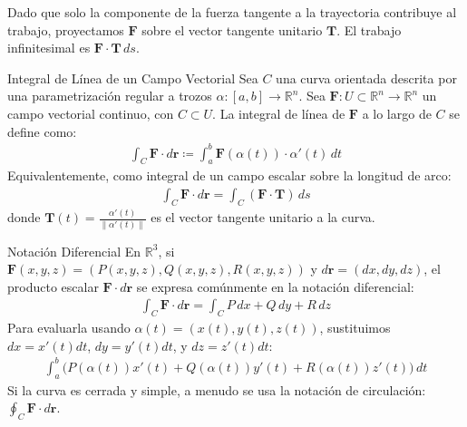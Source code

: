 \documentclass[11pt,a4paper]{article}
\begin{document}
Dado que solo la componente de la fuerza tangente a la trayectoria contribuye al trabajo, proyectamos $\mathbf{F}$ sobre el vector tangente unitario $\mathbf{T}$. El trabajo infinitesimal es $\mathbf{F} \cdot \mathbf{T} \, ds$.

\begin{definicionbox}{Integral de Línea de un Campo Vectorial}
Sea $C$ una curva orientada descrita por una parametrización regular a trozos $\alpha: [a,b] \to \mathbb{R}^n$. Sea $\mathbf{F}: U \subset \mathbb{R}^n \to \mathbb{R}^n$ un campo vectorial continuo, con $C \subset U$. La integral de línea de $\mathbf{F}$ a lo largo de $C$ se define como:
\begin{align*}
\int_C \mathbf{F} \cdot d\mathbf{r} \coloneqq \int_a^b \mathbf{F}(\alpha(t)) \cdot \alpha'(t) \, dt
\end{align*}
Equivalentemente, como integral de un campo escalar sobre la longitud de arco:
\begin{align*}
\int_C \mathbf{F} \cdot d\mathbf{r} = \int_C (\mathbf{F} \cdot \mathbf{T}) \, ds
\end{align*}
donde $\mathbf{T}(t) = \frac{\alpha'(t)}{\|\alpha'(t)\|}$ es el vector tangente unitario a la curva.
\end{definicionbox}

\begin{observacionbox}{Notación Diferencial}
En $\mathbb{R}^3$, si $\mathbf{F}(x,y,z) = (P(x,y,z), Q(x,y,z), R(x,y,z))$ y $d\mathbf{r} = (dx, dy, dz)$, el producto escalar $\mathbf{F} \cdot d\mathbf{r}$ se expresa comúnmente en la notación diferencial:
\begin{align*}
\int_C \mathbf{F} \cdot d\mathbf{r} = \int_C P \, dx + Q \, dy + R \, dz
\end{align*}
Para evaluarla usando $\alpha(t) = (x(t), y(t), z(t))$, sustituimos $dx = x'(t)dt$, $dy = y'(t)dt$, y $dz = z'(t)dt$:
\begin{align*}
\int_a^b \Big( P(\alpha(t)) x'(t) + Q(\alpha(t)) y'(t) + R(\alpha(t)) z'(t) \Big) \, dt
\end{align*}
Si la curva es cerrada y simple, a menudo se usa la notación de circulación: $\oint_C \mathbf{F} \cdot d\mathbf{r}$.
\end{observacionbox}
\end{document}
